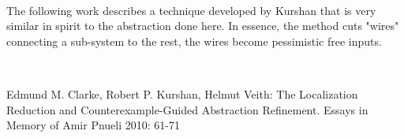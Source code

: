 \begin{enumerate}
~

The following work describes a technique developed by Kurshan that is very similar in spirit to the abstraction done here. In essence, the method cuts "wires" connecting a sub-system to the rest, the wires become pessimistic free inputs.

~

Edmund M. Clarke, Robert P. Kurshan, Helmut Veith:
The Localization Reduction and Counterexample-Guided Abstraction Refinement. Essays in Memory of Amir Pnueli 2010: 61-71


~



\end{enumerate}

